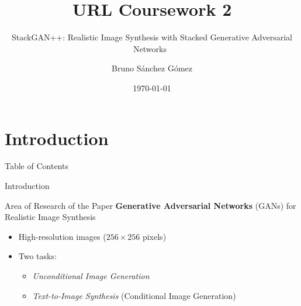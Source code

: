 \documentclass{beamer}
\title{URL Coursework 2}
\subtitle{StackGAN++: Realistic Image Synthesis with Stacked Generative Adversarial Networks~\cite{stackgan++}}
\author{Bruno Sánchez Gómez}
\date{\today}
\newcommand{\paperfigure}[3][width=\textwidth]{%
    \begin{figure}%
        \centering%
        \texttt{[image: figures/\#2.png]}%
        \caption{#3 (Source:~\cite{stackgan++})}%
    \end{figure}%
}
\begin{document}
\begin{frame}
    \titlepage
\end{frame}

\section{Introduction}
\begin{frame}{Table of Contents}
    \tableofcontents[currentsection]
\end{frame}

\begin{frame}{Introduction}
    \begin{block}{Area of Research of the Paper}
        \textbf{Generative Adversarial Networks} (GANs) for Realistic Image Synthesis
    \end{block}
    \begin{itemize}
        \item High-resolution images ($256 \times 256$ pixels)
        \item Two tasks:
        \begin{itemize}
            \item \textit{Unconditional Image Generation} %
            \item \textit{Text-to-Image Synthesis} (Conditional Image Generation) %
        \end{itemize}
    \end{itemize}
    \vspace{0.5cm}
    \begin{figure}
        \centering
    \end{figure}
\end{frame}
\end{document}
